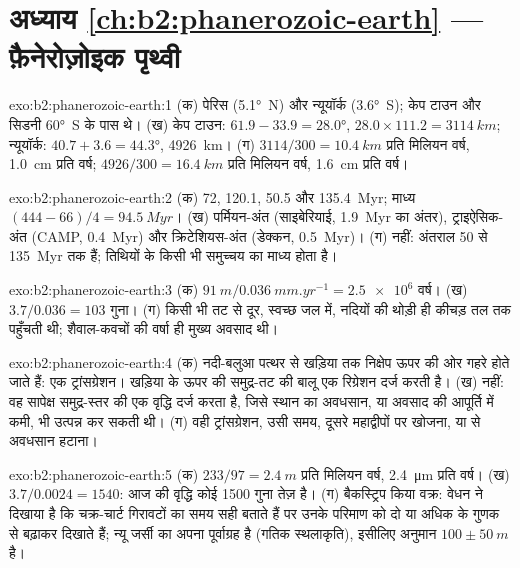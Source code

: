 \section*{अध्याय \ref{ch:b2:phanerozoic-earth} --- फ़ैनेरोज़ोइक पृथ्वी}

\begin{solution}{exo:b2:phanerozoic-earth:1}
(क) पेरिस (\ang{5.1}~N) और न्यूयॉर्क (\ang{3.6}~S); केप टाउन और सिडनी \ang{60}~S के पास थे।
(ख) केप टाउन: $61.9 - 33.9 = \ang{28.0}$, $28.0 \times 111.2 = \qty{3114}{km}$; न्यूयॉर्क:
$40.7 + 3.6 = \ang{44.3}$, \qty{4926}{km}। (ग) $3114/300 = \qty{10.4}{km}$ प्रति मिलियन वर्ष,
\qty{1.0}{cm} प्रति वर्ष; $4926/300 = \qty{16.4}{km}$ प्रति मिलियन वर्ष, \qty{1.6}{cm} प्रति वर्ष।
\end{solution}

\begin{solution}{exo:b2:phanerozoic-earth:2}
(क) 72, 120.1, 50.5 और \qty{135.4}{Myr}; माध्य $(444 - 66)/4 = \qty{94.5}{Myr}$। (ख)
पर्मियन-अंत (साइबेरियाई, \qty{1.9}{Myr} का अंतर), ट्राइऐसिक-अंत (CAMP, \qty{0.4}{Myr}) और
क्रिटेशियस-अंत (डेक्कन, \qty{0.5}{Myr})। (ग) नहीं: अंतराल 50 से
\qty{135}{Myr} तक हैं; तिथियों के किसी भी समुच्चय का माध्य होता है।
\end{solution}

\begin{solution}{exo:b2:phanerozoic-earth:3}
(क) $\qty{91}{m}/\qty{0.036}{mm.yr^{-1}} = \num{2.5e6}$ वर्ष। (ख) $3.7/0.036 = 103$ गुना। (ग)
किसी भी तट से दूर, स्वच्छ जल में, नदियों की थोड़ी ही कीचड़ तल तक पहुँचती थी; शैवाल-कवचों की
वर्षा ही मुख्य अवसाद थी।
\end{solution}

\begin{solution}{exo:b2:phanerozoic-earth:4}
(क) नदी-बलुआ पत्थर से खड़िया तक निक्षेप ऊपर की ओर गहरे होते जाते हैं: एक ट्रांसग्रेशन।
खड़िया के ऊपर की समुद्र-तट की बालू एक रिग्रेशन दर्ज करती है। (ख) नहीं: वह सापेक्ष समुद्र-स्तर की एक वृद्धि दर्ज करता है,
जिसे स्थान का अवधसान, या अवसाद की आपूर्ति में कमी, भी उत्पन्न कर सकती थी। (ग)
वही ट्रांसग्रेशन, उसी समय, दूसरे महाद्वीपों पर खोजना, या  से
अवधसान हटाना।
\end{solution}

\begin{solution}{exo:b2:phanerozoic-earth:5}
(क) $233/97 = \qty{2.4}{m}$ प्रति मिलियन वर्ष, \qty{2.4}{\micro m} प्रति वर्ष। (ख) $3.7/0.0024 =
1540$: आज की वृद्धि कोई 1500 गुना तेज़ है। (ग) बैकस्ट्रिप किया वक्र: वेधन ने दिखाया है
कि चक्र-चार्ट गिरावटों का समय सही बताते हैं पर उनके परिमाण को दो या अधिक के गुणक से बढ़ाकर दिखाते
हैं; न्यू जर्सी का अपना पूर्वाग्रह है (गतिक स्थलाकृति), इसीलिए अनुमान $100 \pm
\qty{50}{m}$ है।
\end{solution}

